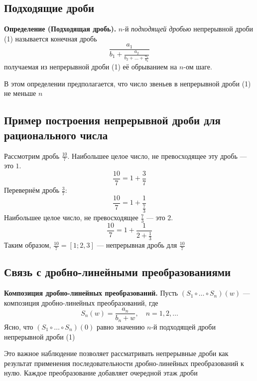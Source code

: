\documentclass[a4paper,12pt]{article}
\theoremstyle{definition}
\theoremstyle{plain}
\theoremstyle{remark}
\begin{document}
	\subsection{Подходящие дроби}
	
	\noindent \textbf{Определение (Подходящая дробь).}
	$n$-й \textit{подходящей дробью} непрерывной дроби (1) называется конечная дробь
	\[
	\frac{a_1}{b_1 + \frac{a_2}{b_2 + \dots + \frac{a_n}{b_n}}}
	\]
	получаемая из непрерывной дроби (1) её обрыванием на $n$-ом шаге.
	
	В этом определении предполагается, что число звеньев в непрерывной дроби (1) не меньше $n$
	
	\subsection{Пример построения непрерывной дроби для рационального числа}
	
	\begin{tcolorbox}[colback=gray!5, colframe=gray!50, title=Пример: $\frac{10}{7}$]
		Рассмотрим дробь $\frac{10}{7}$. Наибольшее целое число, не превосходящее эту дробь — это $1$.
		\[
		\frac{10}{7} = 1 + \frac{3}{7}
		\]
		Перевернём дробь $\frac{3}{7}$:
		\[
		\frac{10}{7} = 1 + \frac{1}{\frac{7}{3}}
		\]
		Наибольшее целое число, не превосходящее $\frac{7}{3}$ — это $2$.
		\[
		\frac{10}{7} = 1 + \frac{1}{2 + \frac{1}{3}}
		\]
		Таким образом, $\frac{10}{7} = [1; 2, 3]$ — непрерывная дробь для $\frac{10}{7}$
	\end{tcolorbox}
	
	\subsection{Связь с дробно-линейными преобразованиями}
	
	\noindent \textbf{Композиция дробно-линейных преобразований.}
	Пусть $(S_1 \circ \dots \circ S_n)(w)$ — композиция дробно-линейных преобразований, где
	\[
	S_n(w) = \frac{a_n}{b_n + w}, \quad n = 1, 2, \dots
	\]
	Ясно, что $(S_1 \circ \dots \circ S_n)(0)$ равно значению $n$-й подходящей дроби непрерывной дроби (1)
	
	\begin{tcolorbox}[colback=green!5, colframe=green!50!black, title=Пояснение]
		Это важное наблюдение позволяет рассматривать непрерывные дроби как результат применения последовательности дробно-линейных преобразований к нулю. Каждое преобразование добавляет очередной этаж дроби
	\end{tcolorbox}
	
\end{document}
